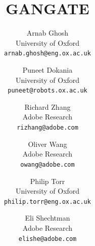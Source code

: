 \documentclass[10pt,twocolumn,letterpaper]{article}
\begin{document}
\title{GANGATE}

\author{Arnab Ghosh\\
University of Oxford\\
{\tt\small arnab.ghosh@eng.ox.ac.uk}
\and
Puneet Dokania\\
University of Oxford\\
{\tt\small puneet@robots.ox.ac.uk}
\and
Richard Zhang\\
Adobe Research\\
{\tt\small rizhang@adobe.com}
\and
Oliver Wang\\
Adobe Research\\
{\tt\small owang@adobe.com}
\and
Philip Torr\\
University of Oxford\\
{\tt\small philip.torr@eng.ox.ac.uk}
\and
Eli Shechtman\\
Adobe Research\\
{\tt\small elishe@adobe.com}
}





\end{document}
